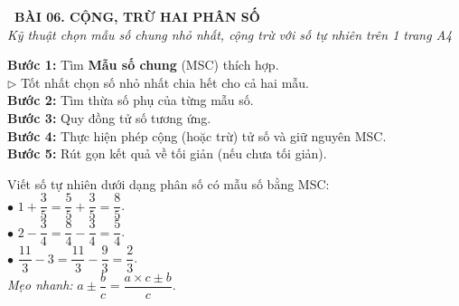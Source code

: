 \documentclass[14pt,a4paper,oneside]{extbook}
\begin{document}
\noindent
\begin{tcolorbox}[
  enhanced,
  colback=teal!8!white,
  colframe=teal!80!black,
  arc=3mm,
  boxrule=1.1pt,
  width=\linewidth,
  halign=center,
  top=2.2mm, bottom=2.2mm,
  left=3mm, right=3mm,
  drop fuzzy shadow
]
  {\large\bfseries\color{teal!95!black}\faBookmark\ BÀI 06. CỘNG, TRỪ HAI PHÂN SỐ}\\[2pt]
  {\scriptsize\color{black!75}\itshape Kỹ thuật chọn mẫu số chung nhỏ nhất, cộng trừ với số tự nhiên trên 1 trang A4}
\end{tcolorbox}

\vspace{3.2mm}
\noindent
\begin{minipage}[t]{0.55\textwidth}
  \begin{tcolorbox}[
    enhanced,
    title={\footnotesize\bfseries\color{white}\faKey\ 1. Quy trình cộng, trừ 2 phân số khác mẫu},
    colback=blue!2!white,
    colframe=blue!75!black,
    arc=2.5mm, boxrule=0.8pt, top=1.8mm, bottom=1.8mm, left=2.2mm, right=2.2mm
  ]
    \footnotesize
    \textbf{Bước 1:} Tìm \textbf{Mẫu số chung} (MSC) thích hợp.\\
    $\triangleright$ Tốt nhất chọn số nhỏ nhất chia hết cho cả hai mẫu.\\
    \textbf{Bước 2:} Tìm thừa số phụ của từng mẫu số.\\
    \textbf{Bước 3:} Quy đồng tử số tương ứng.\\
    \textbf{Bước 4:} Thực hiện phép cộng (hoặc trừ) tử số và giữ nguyên MSC.\\
    \textbf{Bước 5:} Rút gọn kết quả về tối giản (nếu chưa tối giản).
  \end{tcolorbox}
\end{minipage}%
\hfill
\begin{minipage}[t]{0.43\textwidth}
  \begin{tcolorbox}[
    enhanced,
    title={\footnotesize\bfseries\color{white}\faSliders\ 2. Cộng, trừ với số tự nhiên},
    colback=teal!2!white,
    colframe=teal!75!black,
    arc=2.5mm, boxrule=0.8pt, top=1.8mm, bottom=1.8mm, left=2mm, right=2mm
  ]
    \footnotesize
    Viết số tự nhiên dưới dạng phân số có mẫu số bằng MSC:\\
    $\bullet$ $1 + \dfrac{3}{5} = \dfrac{5}{5} + \dfrac{3}{5} = \dfrac{8}{5}$.\\[2pt]
    $\bullet$ $2 - \dfrac{3}{4} = \dfrac{8}{4} - \dfrac{3}{4} = \dfrac{5}{4}$.\\[2pt]
    $\bullet$ $\dfrac{11}{3} - 3 = \dfrac{11}{3} - \dfrac{9}{3} = \dfrac{2}{3}$.\\[2pt]
    \textit{Mẹo nhanh:} $a \pm \dfrac{b}{c} = \dfrac{a \times c \pm b}{c}$.
  \end{tcolorbox}
\end{minipage}
\end{document}

